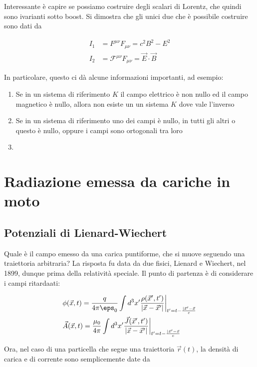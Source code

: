 \documentclass{report}
\begin{document}
Interessante è capire se possiamo costruire degli scalari di Lorentz, che quindi sono ivarianti sotto boost. Si dimostra che gli unici due che è possibile costruire sono dati da 

\begin{align}
    I_1 &= F^{\mu\nu}F_{\mu\nu} = c^2B^2 - E^2\\
    I_2 &= \mathcal{F}^{\mu\nu}F_{\mu\nu} = \vec{E}\cdot \vec{B}
\end{align}

In particolare, questo ci dà alcune informazioni importanti, ad esempio: 

\begin{enumerate}
    \item Se in un sistema di riferimento \(K\) il campo elettrico è non nullo ed il campo magnetico è nullo, allora non esiste un un sistema \(K\) dove vale l'inverso 
    \item Se in un sistema di riferimento uno dei campi è nullo, in tutti gli altri o questo è nullo, oppure i campi sono ortogonali tra loro 
    \item 
\end{enumerate}



\chapter{Radiazione emessa da cariche in moto}

\section{Potenziali di Lienard-Wiechert}

Quale è il campo emesso da una carica puntiforme, che si muove seguendo una traiettoria arbitraria? La risposta fu data da due fisici, Lienard e Wiechert, nel 1899, dunque prima della relatività speciale. Il punto di partenza è di considerare i campi ritardaati: 


\begin{align}
    &\phi(\vec{x}, t) = \frac{q}{4\pi \eps_0}\int d^3x' \frac{\rho(\vec{x}', t')}{|\vec{x}-\vec{x}'|}\biggr|_{t' = t - \frac{|\vec{x}'-\vec{x}}{c}} \\
    &\vec{A}(\vec{x}, t) = \frac{\mu_0}{4\pi}\int d^3x' \frac{\vec{J}(\vec{x}', t')}{|\vec{x}-\vec{x}'|}\biggr|_{t' = t - \frac{|\vec{x}'-\vec{x}}{c}}
\end{align}

Ora, nel caso di una particella che segue una traiettoria \(\vec{r}(t)\), la densità di carica e di corrente sono semplicemente date da 
\end{document}
